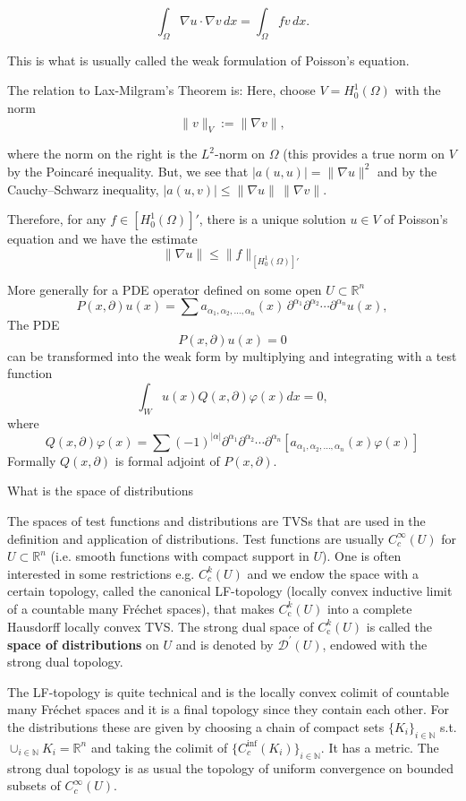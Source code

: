 \[
    \int_\Omega \nabla u \cdot \nabla v \,dx = \int_\Omega f v \,dx.
\]

This is what is usually called the weak formulation of Poisson's equation.

The relation to Lax-Milgram's Theorem is:
Here, choose \(V = H^1_0(\Omega)\) with the norm
\[
    \|v\|_V := \|\nabla v\|,
\]

where the norm on the right is the \(L^2\)-norm on \(\Omega\) (this provides a true norm on \(V\) by the Poincaré inequality.
But, we see that \(|a(u,u)| = \|\nabla u\|^2\) and by the Cauchy–Schwarz inequality, \(|a(u,v)| \le \|\nabla u\|\,\|\nabla v\|\).

Therefore, for any \(f \in [H^1_0(\Omega)]'\), there is a unique solution \(u\in V\) of Poisson's equation and we have the estimate
\[
\|\nabla u\| \le \|f\|_{[H^1_0(\Omega)]'}
\]


More generally for a PDE operator defined on some open \( U \subset \mathbb{R}^n \)
\[
P(x, \partial)u(x)=\sum a_{\alpha_1, \alpha_2, \dots, \alpha_n}(x) \, \partial^{\alpha_1}\partial^{\alpha_2}\cdots \partial^{\alpha_n} u(x), 
\]
The PDE
\[
P(x, \partial)u(x) = 0
\]
can be transformed into the weak form by multiplying and integrating with a test function
\[
\int_W u(x) Q(x, \partial) \varphi (x) dx =0,
\]
where 
\[
    Q(x, \partial)\varphi (x) = \sum (-1)^{| \alpha |} \partial^{\alpha_1} \partial^{\alpha_2} \cdots \partial^{\alpha_n} \left[a_{\alpha_1, \alpha_2, \dots, \alpha_n}(x)  \varphi(x) \right]
\]
Formally \( Q(x, \partial) \) is formal adjoint of \( P(x, \partial) \).


What is the space of distributions

The spaces of test functions and distributions are TVSs that are used in the definition and application of distributions. 
Test functions are usually \( C^\infty_c(U) \) for \( U \subset \mathbb{R}^n  \) (i.e. smooth functions with compact support in \( U \)). 
One is often interested in some restrictions e.g. \( C^k_c(U) \) and we endow the space with a certain topology, 
called the canonical LF-topology (locally convex inductive limit of a countable many Fréchet spaces), that makes 
\( C_{\text{c}}^{k}(U) \) into a complete Hausdorff locally convex TVS. The strong dual space of 
\( C_{\text{c}}^{k}(U) \) is called the \textbf{space of distributions} on  \( U \)
and is denoted by \( \mathcal{D}^{\prime }(U) \), endowed with the strong dual topology.

The LF-topology is quite technical and is the locally convex colimit of countable many Fréchet spaces
and it is a final topology since they contain each other.
For the distributions these are given by choosing a chain of compact sets \( \{K_i\}_{i \in \mathbb{N}} \) s.t. \( \cup_{i \in \mathbb{N}} K_i = \mathbb{R}^n \)
and taking the colimit of \( \{ C^\inf_c(K_i) \}_{i \in \mathbb{N}} \). It has a metric.
The strong dual topology is as usual the topology of uniform convergence on bounded subsets of \( C^\infty_c(U) \).

